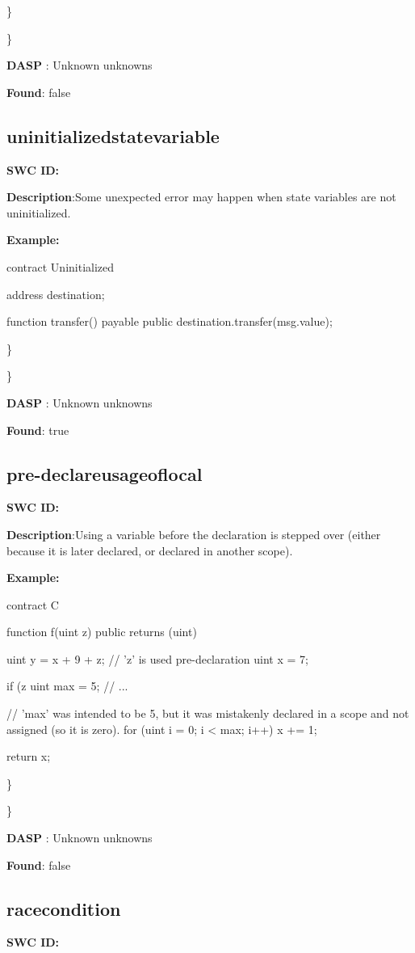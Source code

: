 \documentclass{article}
\begin{document}
{\} 

\} 

\textbf{DASP} : Unknown unknowns

\textbf{Found}: false

\subsection{uninitialized\textunderscore state\textunderscore variable} 
\textbf{SWC \textunderscore ID:} 

\textbf{Description}:Some unexpected error may happen when state variables are not uninitialized.


\textbf{Example:} 

contract Uninitialized{
    address destination;

    function transfer() payable public{
        destination.transfer(msg.value);
    }
}

\} 

\} 

\textbf{DASP} : Unknown unknowns

\textbf{Found}: true

\subsection{pre-declare\textunderscore usage\textunderscore of\textunderscore local} 
\textbf{SWC \textunderscore ID:} 

\textbf{Description}:Using a variable before the declaration is stepped over (either because it is later declared, or declared in another scope).


\textbf{Example:} 

contract C {
    function f(uint z) public returns (uint) {
        uint y = x + 9 + z; // 'z' is used pre-declaration
        uint x = 7;

        if (z %
            uint max = 5;
            // ...
        }

        // 'max' was intended to be 5, but it was mistakenly declared in a scope and not assigned (so it is zero).
        for (uint i = 0; i < max; i++) {
            x += 1;
        }

        return x;
    }
}

\} 

\} 

\textbf{DASP} : Unknown unknowns

\textbf{Found}: false

\subsection{race\textunderscore condition} 
\textbf{SWC \textunderscore ID:} 
\end{document}
